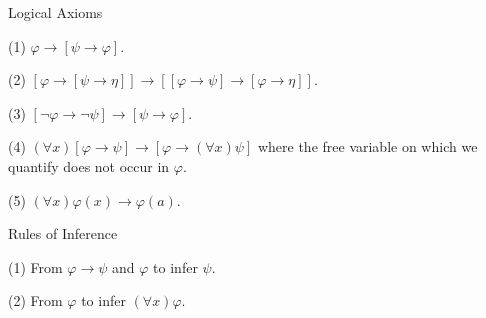 Logical Axioms

(1) $\varphi \rightarrow [\psi \rightarrow \varphi]$.

(2) $[\varphi \rightarrow [\psi \rightarrow \eta]] \rightarrow [[\varphi \rightarrow \psi] \rightarrow [\varphi \rightarrow \eta]]$.

(3) $[\neg \varphi \rightarrow \neg \psi] \rightarrow [\psi \rightarrow \varphi]$.

(4) $(\forall x)[\varphi \rightarrow \psi] \rightarrow [\varphi \rightarrow (\forall x)\psi]$ where the free variable on which we quantify does not occur in $\varphi$.

(5) $(\forall x)\varphi(x) \rightarrow \varphi(a)$.

Rules of Inference

(1) From $\varphi \rightarrow \psi$ and $\varphi$ to infer $\psi$.

(2) From $\varphi$ to infer $(\forall x)\varphi$.
